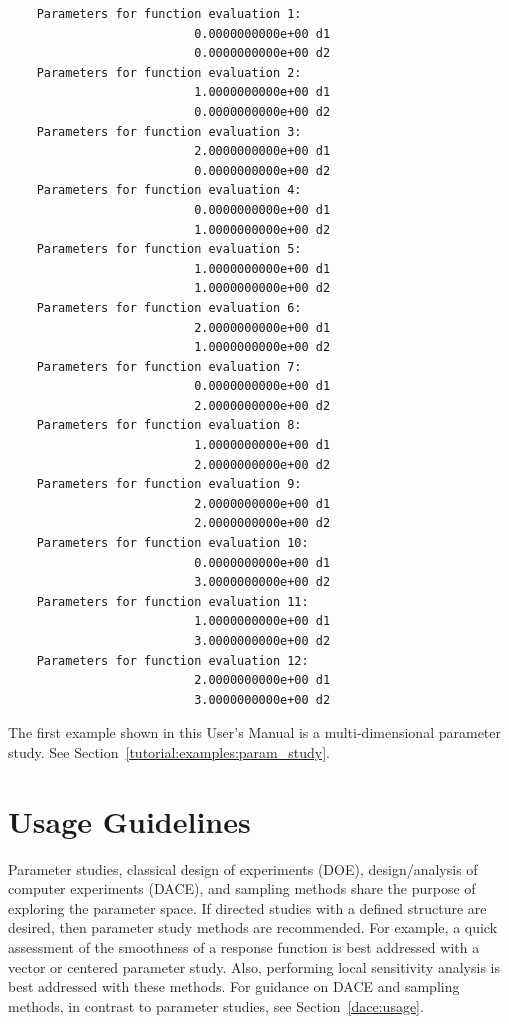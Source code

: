 \begin{small}
\begin{verbatim}
    Parameters for function evaluation 1:
                          0.0000000000e+00 d1   
                          0.0000000000e+00 d2   
    Parameters for function evaluation 2:
                          1.0000000000e+00 d1   
                          0.0000000000e+00 d2   
    Parameters for function evaluation 3:
                          2.0000000000e+00 d1   
                          0.0000000000e+00 d2   
    Parameters for function evaluation 4:
                          0.0000000000e+00 d1   
                          1.0000000000e+00 d2   
    Parameters for function evaluation 5:
                          1.0000000000e+00 d1   
                          1.0000000000e+00 d2   
    Parameters for function evaluation 6:
                          2.0000000000e+00 d1   
                          1.0000000000e+00 d2   
    Parameters for function evaluation 7:
                          0.0000000000e+00 d1   
                          2.0000000000e+00 d2   
    Parameters for function evaluation 8:
                          1.0000000000e+00 d1   
                          2.0000000000e+00 d2   
    Parameters for function evaluation 9:
                          2.0000000000e+00 d1   
                          2.0000000000e+00 d2   
    Parameters for function evaluation 10:
                          0.0000000000e+00 d1   
                          3.0000000000e+00 d2   
    Parameters for function evaluation 11:
                          1.0000000000e+00 d1   
                          3.0000000000e+00 d2   
    Parameters for function evaluation 12:
                          2.0000000000e+00 d1   
                          3.0000000000e+00 d2
\end{verbatim}
\end{small}

The first example shown in this User's Manual is a multi-dimensional
parameter study. See Section~\ref{tutorial:examples:param_study}.

\section{Usage Guidelines}\label{ps:usage}

Parameter studies, classical design of experiments (DOE),
design/analysis of computer experiments (DACE), and sampling methods
share the purpose of exploring the parameter space.  If directed
studies with a defined structure are desired, then parameter study
methods are recommended. For example, a quick assessment of the
smoothness of a response function is best addressed with a vector or
centered parameter study. Also, performing local sensitivity analysis
is best addressed with these methods.  For guidance on DACE and
sampling methods, in contrast to parameter studies,
see Section~\ref{dace:usage}.
